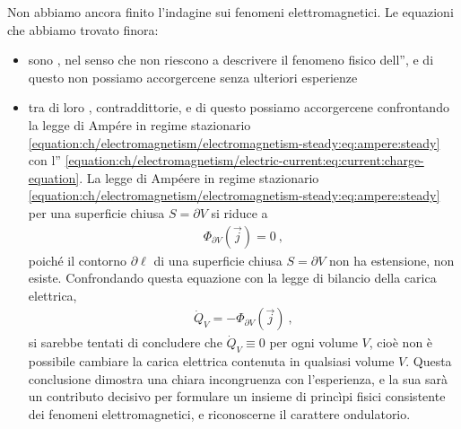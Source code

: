 \documentclass[letterpaper,10pt,italian]{jupyterBook}
\begin{document}
\sphinxAtStartPar
Non abbiamo ancora finito l’indagine sui fenomeni elettromagnetici. Le equazioni che abbiamo trovato finora:
\begin{itemize}
\item {} 
\sphinxAtStartPar
sono , nel senso che non riescono a descrivere il fenomeno fisico dell”{\hyperref[\detokenize{ch/electromagnetism/electromagnetism-general:physics-hs-electromagnetism-electromagnetism-general-em-induction}]{}}, e di questo non possiamo accorgercene senza ulteriori esperienze

\item {} 
\sphinxAtStartPar
tra di loro , contraddittorie, e di questo possiamo accorgercene confrontando la legge di Ampére in regime stazionario \eqref{equation:ch/electromagnetism/electromagnetism-steady:eq:ampere:steady} con l”{\hyperref[\detokenize{ch/electromagnetism/electric-current:physics-hs-electromagnetism-charge-conservation}]{}} \eqref{equation:ch/electromagnetism/electric-current:eq:current:charge-equation}. La legge di Ampéere in regime stazionario \eqref{equation:ch/electromagnetism/electromagnetism-steady:eq:ampere:steady} per una superficie chiusa \(S = \partial V\) si riduce a
\begin{equation*}
\begin{split}\Phi_{\partial V}(\vec{j}) = 0 \ ,\end{split}
\end{equation*}
\sphinxAtStartPar
poiché il contorno \(\partial \ell\) di una superficie chiusa \(S = \partial V\) non ha estensione, non esiste. Confrondando questa equazione con la legge di bilancio della carica elettrica,
\begin{equation*}
\begin{split}\dot{Q}_V = - \Phi_{\partial V}(\vec{j}) \ ,\end{split}
\end{equation*}
\sphinxAtStartPar
si sarebbe tentati di concludere che \(\dot{Q}_V \equiv 0\) per ogni volume \(V\), cioè non è possibile cambiare la carica elettrica contenuta in qualsiasi volume \(V\). Questa conclusione dimostra una chiara incongruenza con l’esperienza, e la sua {\hyperref[\detokenize{ch/electromagnetism/electromagnetism-general:physics-hs-electromagnetism-electromagnetism-general-ampere-maxwell}]{}} sarà un contributo decisivo per formulare un insieme di princìpi fisici consistente dei fenomeni elettromagnetici, e riconoscerne il carattere ondulatorio.

\end{itemize}
\end{document}
